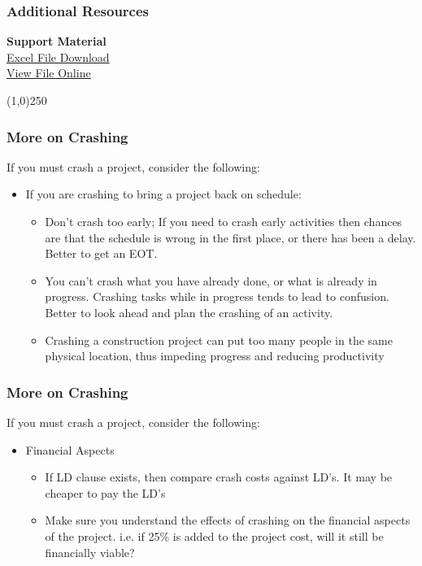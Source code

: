 \begin{frame}
\frametitle{Additional Resources}
\textbf{Support Material}\\
\href{https://sites.google.com/site/paulveseyresourcefiles/project-management/Lecture_17_Excel_File.xlsx?attredirects=0&d=1}{Excel File Download}\\
\href{https://docs.google.com/viewer?a=v&pid=sites&srcid=ZGVmYXVsdGRvbWFpbnxwYXVsdmVzZXlyZXNvdXJjZWZpbGVzfGd4OjU0ZmY0NjJhZWMzMTZmNTE}{View File Online}
\end{frame}
\begin{center}\line(1,0){250}\end{center}





\begin{frame}
\frametitle{More on Crashing}
If you must crash a project, consider the following:
\begin{itemize}
	\item If you are crashing to bring a project back on schedule:
			\begin{itemize}
				\item Don't crash too early; If you need to crash early activities then chances are that the schedule is wrong in the first place, or there has been a delay.  Better to get an EOT.
				\item You can't crash what you have already done, or what is already in progress.  Crashing tasks while in progress tends to lead to confusion.  Better to look ahead and plan the crashing of an activity.
				\item Crashing a construction project can put too many people in the same physical location, thus impeding progress and reducing productivity
			\end{itemize}
		
\end{itemize}
\end{frame}



\begin{frame}
\frametitle{More on Crashing}
If you must crash a project, consider the following:
\begin{itemize}
	\item Financial Aspects
		\begin{itemize}
			\item If LD clause exists, then compare crash costs against LD's.  It may be cheaper to pay the LD's
			\item Make sure you understand the effects of crashing on the financial aspects of the project.  i.e. if 25\% is added to the project cost, will it still be financially viable?
		\end{itemize}
\end{itemize}
\end{frame}






